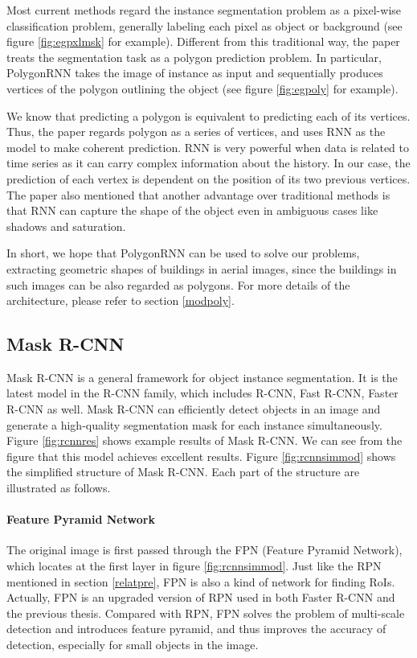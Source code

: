 Most current methods regard the instance segmentation problem as a pixel-wise classification problem, generally labeling each pixel as object or background (see figure \ref{fig:egpxlmsk} for example). Different from this traditional way, the paper treats the segmentation task as a polygon prediction problem. In particular, PolygonRNN takes the image of instance as input and sequentially produces vertices of the polygon outlining the object (see figure \ref{fig:egpoly} for example).



We know that predicting a polygon is equivalent to predicting each of its vertices. Thus, the paper regards polygon as a series of vertices, and uses RNN as the model to make coherent prediction. RNN is very powerful when data is related to time series as it can carry complex information about the history. In our case, the prediction of each vertex is dependent on the position of its two previous vertices. The paper also mentioned that another advantage over traditional methods is that RNN can capture the shape of the object even in ambiguous cases like shadows and saturation.

In short, we hope that PolygonRNN can be used to solve our problems, extracting geometric shapes of buildings in aerial images, since the buildings in such images can be also regarded as polygons. For more details of the architecture, please refer to section \ref{modpoly}.

\subsection{Mask R-CNN}\label{relatrcnn}

Mask R-CNN is a general framework for object instance segmentation. It is the latest model in the R-CNN family, which includes R-CNN, Fast R-CNN, Faster R-CNN as well. Mask R-CNN can efficiently detect objects in an image and generate a high-quality segmentation mask for each instance simultaneously. Figure \ref{fig:rcnnres} shows example results of Mask R-CNN. We can see from the figure that this model achieves excellent results. Figure \ref{fig:rcnnsimmod} shows the simplified structure of Mask R-CNN. Each part of the structure are illustrated as follows.




\paragraph{Feature Pyramid Network} The original image is first passed through the FPN (Feature Pyramid Network), which locates at the first layer in figure \ref{fig:rcnnsimmod}. Just like the RPN mentioned in section \ref{relatpre}, FPN is also a kind of network for finding RoIs. Actually, FPN is an upgraded version of RPN used in both Faster R-CNN and the previous thesis. Compared with RPN, FPN solves the problem of multi-scale detection and introduces feature pyramid, and thus improves the accuracy of detection, especially for small objects in the image.

